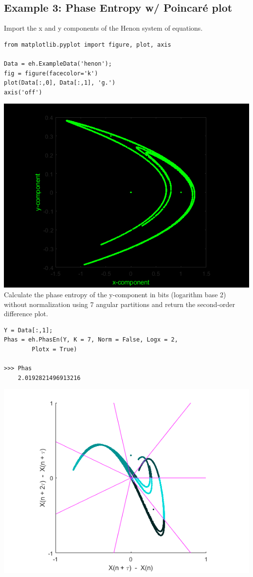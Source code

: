 \documentclass[12pt, a4paper, titlepage, openany]{book}
\begin{document}
\newpage
\subsection{\normalsize Example 3: \hspace{15mm} Phase Entropy w/ Poincaré plot}
\noindent Import the x and y components of the Henon system of equations.
\begin{verbatim}
from matplotlib.pyplot import figure, plot, axis

Data = eh.ExampleData('henon');
fig = figure(facecolor='k')
plot(Data[:,0], Data[:,1], 'g.')
axis('off')
\end{verbatim}
\includegraphics[scale=.5]{henon.png}\newline \newline
Calculate the phase entropy of the y-component in bits (logarithm base 2) without normalization using 7 angular partitions and return the second-order difference plot.
\begin{verbatim}
Y = Data[:,1];
Phas = eh.PhasEn(Y, K = 7, Norm = False, Logx = 2, 
 		Plotx = True)

>>> Phas
	2.0192821496913216
\end{verbatim}
\includegraphics[scale=.6]{phasex1.png}\newline \newline
\end{document}
